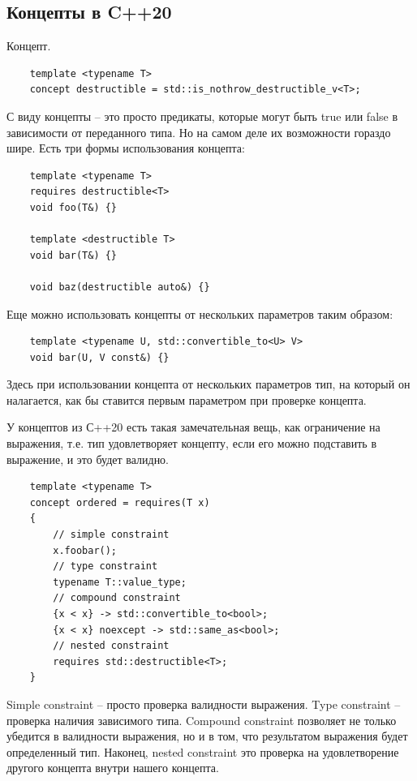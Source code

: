 \documentclass[12pt, a4paper]{article}
\begin{document}
\subsection{Концепты в C++20}
Концепт.
\begin{verbatim}
	template <typename T>
	concept destructible = std::is_nothrow_destructible_v<T>;
\end{verbatim}
С виду концепты -- это просто предикаты, которые могут быть true или false в зависимости от переданного типа. Но на самом деле их возможности гораздо шире.
Есть три формы использования концепта:
\begin{verbatim}
	template <typename T>
	requires destructible<T>
	void foo(T&) {}
	
	template <destructible T>
	void bar(T&) {}
	
	void baz(destructible auto&) {}
\end{verbatim}
Еще можно использовать концепты от нескольких параметров таким образом:
\begin{verbatim}
	template <typename U, std::convertible_to<U> V>
	void bar(U, V const&) {}
\end{verbatim}
Здесь при использовании концепта от нескольких параметров тип, на который он налагается, как бы ставится первым параметром при проверке концепта.
\par У концептов из С++20 есть такая замечательная вещь, как ограничение на выражения, т.е. тип удовлетворяет концепту, если его можно подставить в выражение, и это будет валидно.
\begin{verbatim}
	template <typename T>
	concept ordered = requires(T x)
	{
		// simple constraint
		x.foobar();
		// type constraint
		typename T::value_type;
		// compound constraint
		{x < x} -> std::convertible_to<bool>;
		{x < x} noexcept -> std::same_as<bool>;
		// nested constraint
		requires std::destructible<T>;
	}
\end{verbatim}
Simple constraint -- просто проверка валидности выражения. Type constraint -- проверка наличия зависимого типа. Compound constraint позволяет не только убедится в валидности выражения, но и в том, что результатом выражения будет определенный тип. Наконец, nested constraint это проверка на удовлетворение другого концепта внутри нашего концепта.
\end{document}
